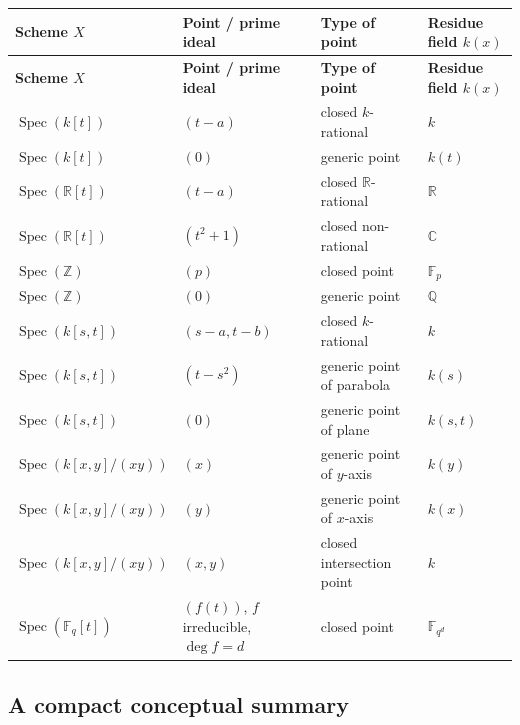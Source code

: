 \documentclass[12pt,a4paper]{article}
\theoremstyle{notespace}
\newcommand{\Spec}{\operatorname{Spec}}
\newcommand{\Z}{\mathbb Z}
\newcommand{\Q}{\mathbb Q}
\newcommand{\R}{\mathbb R}
\newcommand{\C}{\mathbb C}
\newcommand{\F}{\mathbb F}
\theoremstyle{definition}
\begin{document}
\begin{center}
	\renewcommand{\arraystretch}{1.35}
	\begin{longtable}{>{\raggedright\arraybackslash}p{}
			>{\raggedright\arraybackslash}p{}
			>{\raggedright\arraybackslash}p{}
			>{\raggedright\arraybackslash}p{}}
		\toprule
		\textbf{Scheme \(X\)} & \textbf{Point / prime ideal} & \textbf{Type of point} & \textbf{Residue field \(k(x)\)} \\
		\midrule
		\endfirsthead
		
		\toprule
		\textbf{Scheme \(X\)} & \textbf{Point / prime ideal} & \textbf{Type of point} & \textbf{Residue field \(k(x)\)} \\
		\midrule
		\endhead
		
		\bottomrule
		\endfoot
		
		\(\Spec(k[t])\) & \((t-a)\) & closed \(k\)-rational & \(k\) \\
		\(\Spec(k[t])\) & \((0)\) & generic point & \(k(t)\) \\
		\(\Spec(\R[t])\) & \((t-a)\) & closed \(\R\)-rational & \(\R\) \\
		\(\Spec(\R[t])\) & \((t^2+1)\) & closed non-rational & \(\C\) \\
		\(\Spec(\Z)\) & \((p)\) & closed point & \(\F_p\) \\
		\(\Spec(\Z)\) & \((0)\) & generic point & \(\Q\) \\
		\(\Spec(k[s,t])\) & \((s-a,t-b)\) & closed \(k\)-rational & \(k\) \\
		\(\Spec(k[s,t])\) & \((t-s^2)\) & generic point of parabola & \(k(s)\) \\
		\(\Spec(k[s,t])\) & \((0)\) & generic point of plane & \(k(s,t)\) \\
		\(\Spec(k[x,y]/(xy))\) & \((x)\) & generic point of \(y\)-axis & \(k(y)\) \\
		\(\Spec(k[x,y]/(xy))\) & \((y)\) & generic point of \(x\)-axis & \(k(x)\) \\
		\(\Spec(k[x,y]/(xy))\) & \((x,y)\) & closed intersection point & \(k\) \\
		\(\Spec(\F_q[t])\) & \((f(t))\), \(f\) irreducible, \(\deg f=d\) & closed point & \(\F_{q^d}\) \\
	\end{longtable}
\end{center}

\subsection{A compact conceptual summary}
\end{document}
